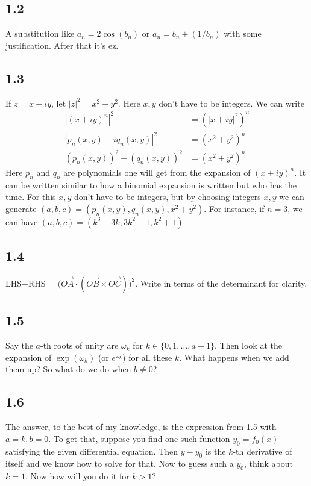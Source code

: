 \documentclass{article}
\begin{document}
\subsection*{1.2}
A substitution like $a_n = 2\cos(b_n)$ or $a_n = b_n + (1/b_n)$ with some justification. After that it's ez.

\subsection*{1.3}
If $z = x+iy$, let $|z|^2 = x^2+y^2$. Here $x,y$ don't have to be integers. We can write
\begin{align*}
    |(x+iy)^n|^2 &= (|x+iy|^2)^n \\
    |p_n(x,y) + i q_n(x,y)|^2 &= (x^2+y^2)^n \\
    \left(p_n(x,y)\right)^2 + \left(q_n(x,y)\right)^2 &= (x^2+y^2)^n
\end{align*}
Here $p_n$ and $q_n$ are polynomials one will get from the expansion of $(x+iy)^n$. It can be written similar to how a binomial expansion is written but who has the time. For this $x,y$ don't have to be integers, but by choosing integers $x,y$ we can generate $(a,b,c) = (p_n(x,y), q_n(x,y), x^2+y^2)$. For instance, if $n = 3$, we can have $(a,b,c) = (k^3 - 3k, 3k^2 - 1, k^2+1)$

\subsection*{1.4}
LHS$-$RHS = $\bigg(\overrightarrow{OA} \cdot (\overrightarrow{OB} \times \overrightarrow{OC})\bigg)^2$. Write in terms of the determinant for clarity.

\subsection*{1.5}
Say the $a$-th roots of unity are $\omega_k$ for $k\in \{0,1,\dots,a-1\}$. Then look at the expansion of $\exp(\omega_k)$ (or $e^{\omega_k}$) for all these $k$. What happens when we add them up? So what do we do when $b\neq0$?

\subsection*{1.6}
The answer, to the best of my knowledge, is the expression from 1.5 with $a=k,b=0$. To get that, suppose you find one such function $y_0 = f_0(x)$ satisfying the given differential equation. Then $y-y_0$ is the $k$-th derivative of itself and we know how to solve for that. Now to guess such a $y_0$, think about $k=1$. Now how will you do it for $k>1$?
\end{document}
